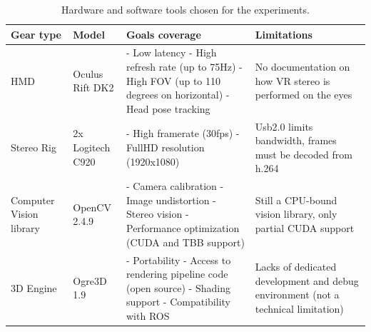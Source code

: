 \begin{table}[]
\centering
\begin{tabular}{llll}
\hline
Gear type                       & Model                                & Goals coverage                                                                                                & Limitations                                                                                            \\ \hline
\multicolumn{1}{|l|}{HMD}       & \multicolumn{1}{l|}{Oculus Rift DK2} & \multicolumn{1}{p{0.4\linewidth}|}{
- Low latency \newline
- High refresh rate (up to 75Hz) \newline
- High FOV (up to 110 degrees on horizontal)\newline
- Head pose tracking
}                                                & \multicolumn{1}{p{0.2\linewidth}|}{No documentation on how VR stereo is performed on the eyes}                        \\ \hline
\multicolumn{1}{|l|}{Stereo Rig}    & \multicolumn{1}{l|}{2x Logitech C920}   & \multicolumn{1}{p{0.4\linewidth}|}{
- High framerate (30fps)\newline
- FullHD resolution (1920x1080)
}                                            & \multicolumn{1}{p{0.2\linewidth}|}{Usb2.0 limits bandwidth, frames must be decoded from h.264}                        \\ \hline
\multicolumn{1}{|p{0.1\linewidth}|}{Computer Vision library}    & \multicolumn{1}{l|}{OpenCV 2.4.9}    & \multicolumn{1}{p{0.4\linewidth}|}{
- Camera calibration \newline
- Image undistortion \newline
- Stereo vision \newline
- Performance optimization (CUDA and TBB support)
} & \multicolumn{1}{p{0.2\linewidth}|}{Still a CPU-bound vision library, only partial CUDA support}                                                  \\ \hline
\multicolumn{1}{|l|}{3D Engine} & \multicolumn{1}{l|}{Ogre3D 1.9}      & \multicolumn{1}{p{0.4\linewidth}|}{
- Portability \newline
- Access to rendering pipeline code (open source) \newline
- Shading support \newline
- Compatibility with ROS
}   & \multicolumn{1}{p{0.2\linewidth}|}{Lacks of dedicated development and debug environment (not a technical limitation)} \\ \hline
\end{tabular}
\caption{Hardware and software tools chosen for the experiments.}
\label{gear_table}
\end{table}

